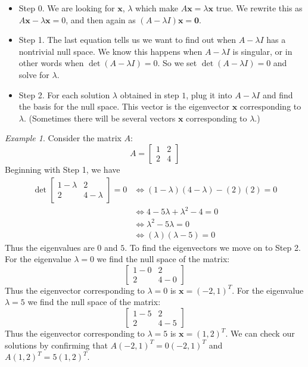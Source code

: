 \documentclass[11pt,oneside]{amsbook}
\theoremstyle{definition}
\theoremstyle{plain}
\theoremstyle{definition}
\theoremstyle{remark}
\newtheorem{example}[theorem]{Example}
\numberwithin{equation}{section}
\numberwithin{figure}{section}
\begin{document}
\begin{itemize}
  \item Step 0. We are looking for $\mathbf{x}$, $\lambda$ which make $A\mathbf{x}=\lambda\mathbf{x}$ true. We rewrite this as $A\mathbf{x}-\lambda\mathbf{x}=0$, and then again as $(A-\lambda I)\mathbf{x}=\mathbf{0}$.
  \item Step 1. The last equation tells us we want to find out when $A-\lambda I$ has a nontrivial null space. We know this happens when $A-\lambda I$ is singular, or in other words when $\det(A-\lambda I)=0$. So we set $\det(A-\lambda I)=0$ and solve for $\lambda$.
  \item Step 2. For each solution $\lambda$ obtained in step $1$, plug it into $A-\lambda I$ and find the basis for the null space. This vector is the eigenvector $\mathbf{x}$ corresponding to $\lambda$. (Sometimes there will be several vectors $\mathbf{x}$ corresponding to $\lambda$.)
\end{itemize}

\begin{example}
  Consider the matrix $A$:
  \[A=\begin{bmatrix}1&2\\2&4\end{bmatrix}
  \]
  Beginning with Step 1, we have
  \begin{align*}
    \det\begin{bmatrix}1-\lambda&2\\2&4-\lambda\end{bmatrix}=0
    &\iff (1-\lambda)(4-\lambda)-(2)(2)=0\\
    &\iff 4-5\lambda+\lambda^2-4=0\\
    &\iff \lambda^2-5\lambda=0\\
    &\iff (\lambda)(\lambda-5)=0
  \end{align*}
  Thus the eigenvalues are $0$ and $5$. To find the eigenvectors we move on to Step 2. For the eigenvalue $\lambda=0$ we find the null space of the matrix:
  \[\begin{bmatrix}1-0&2\\2&4-0\end{bmatrix}
  \]
  Thus the eigenvector corresponding to $\lambda=0$ is $\mathbf{x}=(-2,1)^T$. For the eigenvalue $\lambda=5$ we find the null space of the matrix:
  \[\begin{bmatrix}1-5&2\\2&4-5\end{bmatrix}
  \]
  Thus the eigenvector corresponding to $\lambda=5$ is $\mathbf{x}=(1,2)^T$. We can check our solutions by confirming that $A(-2,1)^T=0(-2,1)^T$ and $A(1,2)^T=5(1,2)^T$.
\end{example}
  
\end{document}
